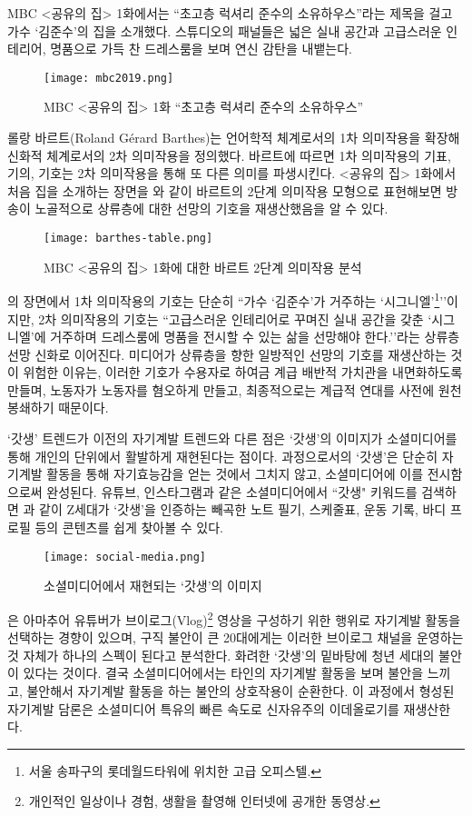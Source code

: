 MBC <공유의 집> 1화에서는 ``초고층 럭셔리 준수의 소유하우스''라는 제목을 걸고 가수 `김준수'의 집을 소개했다. 스튜디오의 패널들은 넓은 실내 공간과 고급스러운 인테리어, 명품으로 가득 찬 드레스룸을 보며 연신 감탄을 내뱉는다.
\begin{figure}[h]
  \centering
  \texttt{[image: mbc2019.png]}
  \caption{MBC <공유의 집> 1화 ``초고층 럭셔리 준수의 소유하우스''}
  \label{fig:mbc2019}
\end{figure}
롤랑 바르트(Roland Gérard Barthes)는 언어학적 체계로서의 1차 의미작용을 확장해 신화적 체계로서의 2차 의미작용을 정의했다. 바르트에 따르면 1차 의미작용의 기표, 기의, 기호는 2차 의미작용을 통해 또 다른 의미를 파생시킨다. <공유의 집> 1화에서 처음 집을 소개하는 장면을 와 같이 바르트의 2단계 의미작용 모형으로 표현해보면 방송이 노골적으로 상류층에 대한 선망의 기호을 재생산했음을 알 수 있다.
\begin{figure}[h]
  \centering
  \texttt{[image: barthes-table.png]}
  \caption{MBC <공유의 집> 1화에 대한 바르트 2단계 의미작용 분석}
  \label{fig:barthes-table}
\end{figure}
의 장면에서 1차 의미작용의 기호는 단순히 ``가수 `김준수'가 거주하는 `시그니엘'\footnote{서울 송파구의 롯데월드타워에 위치한 고급 오피스텔.}''이지만, 2차 의미작용의 기호는 ``고급스러운 인테리어로 꾸며진 실내 공간을 갖춘 `시그니엘'에 거주하며 드레스룸에 명품을 전시할 수 있는 삶을 선망해야 한다.''라는 상류층 선망 신화로 이어진다. 미디어가 상류층을 향한 일방적인 선망의 기호를 재생산하는 것이 위험한 이유는, 이러한 기호가 수용자로 하여금 계급 배반적 가치관을 내면화하도록 만들며, 노동자가 노동자를 혐오하게 만들고, 최종적으로는 계급적 연대를 사전에 원천 봉쇄하기 때문이다.

`갓생' 트렌드가 이전의 자기계발 트렌드와 다른 점은 `갓생'의 이미지가 소셜미디어를 통해 개인의 단위에서 활발하게 재현된다는 점이다. 과정으로서의 `갓생'은 단순히 자기계발 활동을 통해 자기효능감을 얻는 것에서 그치지 않고, 소셜미디어에 이를 전시함으로써 완성된다. 유튜브, 인스타그램과 같은 소셜미디어에서 ``갓생" 키워드를 검색하면 과 같이 Z세대가 `갓생'을 인증하는 빼곡한 노트 필기, 스케줄표, 운동 기록, 바디 프로필 등의 콘텐츠를 쉽게 찾아볼 수 있다.
\begin{figure}[h]
  \centering
  \texttt{[image: social-media.png]}
  \caption{소셜미디어에서 재현되는 `갓생'의 이미지}
  \label{fig:social-media}
\end{figure}
\cite{ksh2022}은 아마추어 유튜버가 브이로그(Vlog)\footnote{개인적인 일상이나 경험, 생활을 촬영해 인터넷에 공개한 동영상.} 영상을 구성하기 위한 행위로 자기계발 활동을 선택하는 경향이 있으며, 구직 불안이 큰 20대에게는 이러한 브이로그 채널을 운영하는 것 자체가 하나의 스펙이 된다고 분석한다. 화려한 `갓생'의 밑바탕에 청년 세대의 불안이 있다는 것이다. 결국 소셜미디어에서는 타인의 자기계발 활동을 보며 불안을 느끼고, 불안해서 자기계발 활동을 하는 불안의 상호작용이 순환한다. 이 과정에서 형성된 자기계발 담론은 소셜미디어 특유의 빠른 속도로 신자유주의 이데올로기를 재생산한다.

